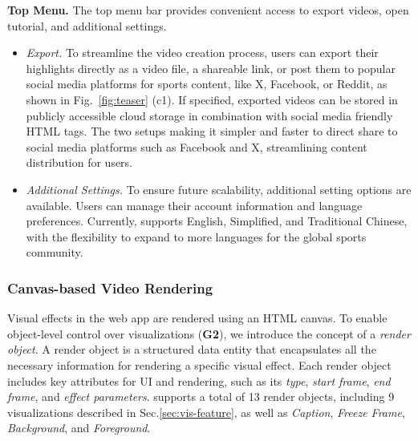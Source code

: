 \vspace{1mm}
\noindent\textbf{Top Menu.}
The top menu bar provides convenient access to export videos, open tutorial, and additional settings.
\begin{itemize}[leftmargin=*]
    \item \emph{Export.} To streamline the video creation process, users can export their highlights directly as a video file, a shareable link, or post them to popular social media platforms for sports content, like X, Facebook, or Reddit, as shown in Fig.~\ref{fig:teaser} (c1).
    If specified, exported videos can be stored in publicly accessible cloud storage in combination with social media friendly HTML tags. The two setups making it simpler and faster to direct share to social media platforms such as Facebook and X, streamlining content distribution for users.

    \item \emph{Additional Settings.}  To ensure future scalability, additional setting options are available.
Users can manage their account information and language preferences. Currently, \SB{} supports English, Simplified, and Traditional Chinese, with the flexibility to expand to more languages for the global sports community.
\end{itemize}





\subsubsection{Canvas-based Video Rendering}
Visual effects in the \SB{} web app are rendered using an HTML canvas.
To enable object-level control over visualizations (\textbf{G2}), 
we introduce the concept of a \textit{render object}.
A render object is a structured data entity that encapsulates all the necessary information for rendering a specific visual effect.
Each render object includes key attributes for UI and rendering, such as its \emph{type}, \emph{start frame}, \emph{end frame}, and \emph{effect parameters}.
\SB{} supports a total of 13 render objects, including 9 visualizations described in Sec.\ref{sec:vis-feature}, 
as well as \textit{Caption}, \textit{Freeze Frame}, \textit{Background}, and \textit{Foreground}.


